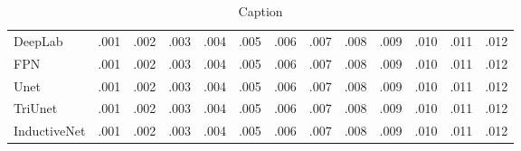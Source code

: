 \begin{table}[h]
\begin{tabularx}{\linewidth}{lXXXXXXXXXXXX}
            \midrule
            DeepLab & .001 & .002 & .003 & .004 & .005 & .006 & .007 & .008 & .009 & .010 & .011 & .012\\
            FPN & .001 & .002 & .003 & .004 & .005 & .006 & .007 & .008 & .009 & .010 & .011 & .012\\
            Unet & .001 & .002 & .003 & .004 & .005 & .006 & .007 & .008 & .009 & .010 & .011 & .012\\
            TriUnet & .001 & .002 & .003 & .004 & .005 & .006 & .007 & .008 & .009 & .010 & .011 & .012\\
            InductiveNet & .001 & .002 & .003 & .004 & .005 & .006 & .007 & .008 & .009 & .010 & .011 & .012\\
            \bottomrule
        \end{tabularx}
    \caption{Caption}
    \label{tab:ablation_iou}
\end{table}